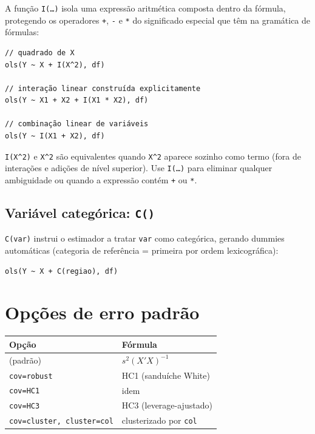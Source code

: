 A função \texttt{I(\ldots)} isola uma expressão aritmética composta
dentro da fórmula, protegendo os operadores \texttt{+}, \texttt{-} e
\texttt{*} do significado especial que têm na gramática de fórmulas:

\begin{lstlisting}[caption={Termos arbitrários com \texttt{I()}}]
// quadrado de X
ols(Y ~ X + I(X^2), df)

// interação linear construída explicitamente
ols(Y ~ X1 + X2 + I(X1 * X2), df)

// combinação linear de variáveis
ols(Y ~ I(X1 + X2), df)
\end{lstlisting}

\begin{nota}
  \texttt{I(X\textasciicircum{}2)} e \texttt{X\textasciicircum{}2} são equivalentes quando
  \texttt{X\textasciicircum{}2} aparece sozinho como termo (fora de
  interações e adições de nível superior). Use \texttt{I(\ldots)} para
  eliminar qualquer ambiguidade ou quando a expressão contém \texttt{+}
  ou \texttt{*}.
\end{nota}

\subsection{Variável categórica: \texttt{C()}}
\label{subsec:formula-categorica}

\texttt{C(var)} instrui o estimador a tratar \texttt{var} como
categórica, gerando dummies automáticas (categoria de referência = primeira
por ordem lexicográfica):

\begin{lstlisting}
ols(Y ~ X + C(regiao), df)
\end{lstlisting}

\section{Opções de erro padrão}

\begin{center}
\begin{tabular}{ll}
\toprule
\textbf{Opção} & \textbf{Fórmula} \\
\midrule
(padrão)                            & $s^2(X'X)^{-1}$ \\
\texttt{cov=robust}                 & HC1 (sanduíche White) \\
\texttt{cov=HC1}                    & idem \\
\texttt{cov=HC3}                    & HC3 (leverage-ajustado) \\
\texttt{cov=cluster, cluster=col}   & clusterizado por \texttt{col} \\
\bottomrule
\end{tabular}
\end{center}

